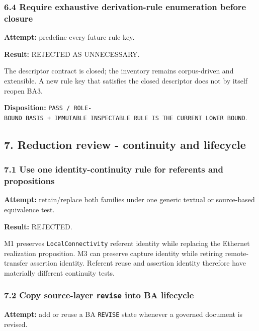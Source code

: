 \documentclass[11pt,a4paper]{article}
\begin{document}
\subsubsection{6.4 Require exhaustive derivation-rule enumeration before closure}\label{require-exhaustive-derivation-rule-enumeration-before-closure}

\textbf{Attempt:} predefine every future rule key.

\textbf{Result:} REJECTED AS UNNECESSARY.

The descriptor contract is closed; the inventory remains corpus-driven and extensible. A new rule key that satisfies the closed descriptor does not by itself reopen BA3.

\textbf{Disposition:} \texttt{PASS\ /\ ROLE-BOUND\ BASIS\ +\ IMMUTABLE\ INSPECTABLE\ RULE\ IS\ THE\ CURRENT\ LOWER\ BOUND}.

\subsection{7. Reduction review - continuity and lifecycle}\label{reduction-review---continuity-and-lifecycle}

\subsubsection{7.1 Use one identity-continuity rule for referents and propositions}\label{use-one-identity-continuity-rule-for-referents-and-propositions}

\textbf{Attempt:} retain/replace both families under one generic textual or source-based equivalence test.

\textbf{Result:} REJECTED.

M1 preserves \texttt{LocalConnectivity} referent identity while replacing the Ethernet realization proposition. M3 can preserve capture identity while retiring remote-transfer assertion identity. Referent reuse and assertion identity therefore have materially different continuity tests.

\subsubsection{\texorpdfstring{7.2 Copy source-layer \texttt{revise} into BA lifecycle}{7.2 Copy source-layer revise into BA lifecycle}}\label{copy-source-layer-revise-into-ba-lifecycle}

\textbf{Attempt:} add or reuse a BA \texttt{REVISE} state whenever a governed document is revised.
\end{document}
